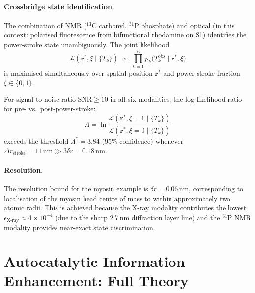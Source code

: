 \paragraph{Crossbridge state identification.}
The combination of NMR ($^{13}$C carbonyl, $^{31}$P phosphate) and optical
(in this context: polarised fluorescence from bifunctional rhodamine on S1)
identifies the power-stroke state unambiguously.  The joint likelihood:
\begin{equation}
  \mathcal{L}(\mathbf{r}^*, \xi \mid \{T_k\})
  \;\propto\;
  \prod_{k=1}^6 p_k\bigl(T_k^\text{obs} \mid \mathbf{r}^*, \xi\bigr)
  \label{eq:ch06-myosin-likelihood}
\end{equation}
is maximised simultaneously over spatial position $\mathbf{r}^*$ and
power-stroke fraction $\xi \in \{0,1\}$.

\begin{proposition}
\label{prop:ch06-myosin-state}
For signal-to-noise ratio $\mathrm{SNR} \geq 10$ in all six modalities, the
log-likelihood ratio for pre- vs.\ post-power-stroke:
\[
  \Lambda = \ln\frac{\mathcal{L}(\mathbf{r}^*, \xi=1 \mid \{T_k\})}
                    {\mathcal{L}(\mathbf{r}^*, \xi=0 \mid \{T_k\})}
\]
exceeds the threshold $\Lambda^* = 3.84$ (95\% confidence) whenever
$\Delta r_\text{stroke} = 11\,\text{nm} \gg 3\delta r = 0.18\,\text{nm}$.
\end{proposition}

\paragraph{Resolution.}
The resolution bound for the myosin example is $\delta r = 0.06\,\text{nm}$,
corresponding to localisation of the myosin head centre of mass to within
approximately two atomic radii.  This is achieved because the X-ray modality
contributes the lowest $\epsilon_\text{X-ray} \approx 4 \times 10^{-4}$
(due to the sharp 2.7\,nm diffraction layer line) and the $^{31}$P NMR
modality provides near-exact state discrimination.

\section{Autocatalytic Information Enhancement: Full Theory}
\label{sec:ch06-information-enhancement-theory}

